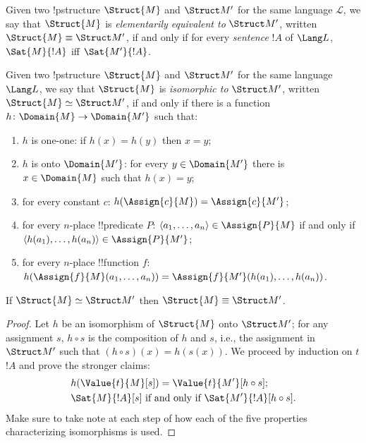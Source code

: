 \documentclass[../../include/open-logic-section]{subfiles}
\begin{document}

\begin{defn}
  Given two !p{structure} $\Struct{M}$ and $\Struct M'$ for the same
  language $\mathcal{L}$, we say that $\Struct{M}$ is
  \emph{elementarily equivalent to} $\Struct M'$, written $\Struct{M}
  \equiv \Struct M'$, if and only if for every \emph{sentence} $!A$ of
  $\Lang L$, $\Sat{M}{!A}$ iff $\Sat{M'}{!A}$.
\end{defn}

\begin{defn}
  Given two !p{structure} $\Struct{M}$ and $\Struct M'$ for the same
  language $\Lang L$, we say that    $\Struct{M}$ is
  \emph{isomorphic to} $\Struct M'$, written
  $\Struct{M} \simeq \Struct M'$, if and only if there is a
  function $h\colon \Domain{M} \to \Domain{M'}$ such that:
  \begin{enumerate}
  \item $h$ is one-one: if $h(x) =
    h(y)$ then $x = y$; 
  \item $h$ is onto $\Domain{M'}$: for every $y \in
    \Domain{M'}$ there is $x \in \Domain{M}$ such that $h(x) = y$;
  \item for every constant $c$: $h(\Assign{c}{M}) =
    \Assign{c}{M'}$; 
  \item for every $n$-place !!{predicate} $P$: $\langle
    a_1,\dots,a_n\rangle \in \Assign{P}{M}$ if and only if  $\langle
    h(a_1),\dots,h(a_n)\rangle \in \Assign{P}{M'}$;
  \item for every $n$-place !!{function} $f$:
    $h(\Assign{f}{M}(a_1,\dots,a_n)) =
    \Assign{f}{M'}(h(a_1),\ldots,h(a_n))$.
 \end{enumerate}
\end{defn}

\begin{thm}
  If $\Struct{M} \simeq \Struct M'$ then $\Struct{M} \equiv
  \Struct M'$.
\end{thm}

\begin{proof}
  Let $h$ be an isomorphism of $\Struct{M}$ onto
  $\Struct M'$; for any assignment $s$, $h \circ s$ is the
  composition of $h$ and $s$, i.e., the assignment in
  $\Struct M'$ such that  $(h \circ s)(x) = h(s(x))$.
  We proceed by induction on $t$ $!A$ and prove the stronger claims: 
  \begin{align*}
  &  h(\Value{t}{M}[s]) = \Value{t}{M'}[h\circ s];\\
  &  \Sat{M}{!A}[s] \text{ if and only if }
    \Sat{M'}{!A}[h \circ s].
  \end{align*}
Make sure to take note at each step of how each of the five properties
characterizing isomorphisms is used.    
\end{proof}
\end{document}
